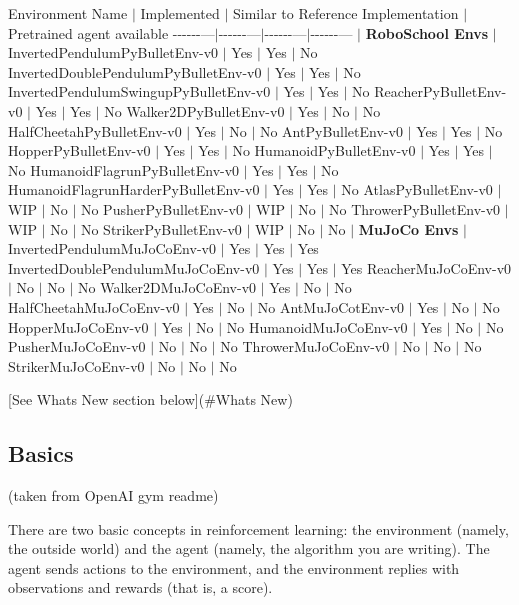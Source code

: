 Environment Name $\vert$ Implemented $\vert$ Similar to Reference Implementation $\vert$ Pretrained agent available -\/-\/-\/-\/-\/-\/---$\vert$-\/-\/-\/-\/-\/-\/---$\vert$-\/-\/-\/-\/-\/-\/---$\vert$-\/-\/-\/-\/-\/-\/--- $\vert$ {\bfseries Robo\+School Envs} $\vert$ Inverted\+Pendulum\+Py\+Bullet\+Env-\/v0 $\vert$ Yes $\vert$ Yes $\vert$ No Inverted\+Double\+Pendulum\+Py\+Bullet\+Env-\/v0 $\vert$ Yes $\vert$ Yes $\vert$ No Inverted\+Pendulum\+Swingup\+Py\+Bullet\+Env-\/v0 $\vert$ Yes $\vert$ Yes $\vert$ No Reacher\+Py\+Bullet\+Env-\/v0 $\vert$ Yes $\vert$ Yes $\vert$ No Walker2\+D\+Py\+Bullet\+Env-\/v0 $\vert$ Yes $\vert$ No $\vert$ No Half\+Cheetah\+Py\+Bullet\+Env-\/v0 $\vert$ Yes $\vert$ No $\vert$ No Ant\+Py\+Bullet\+Env-\/v0 $\vert$ Yes $\vert$ Yes $\vert$ No Hopper\+Py\+Bullet\+Env-\/v0 $\vert$ Yes $\vert$ Yes $\vert$ No Humanoid\+Py\+Bullet\+Env-\/v0 $\vert$ Yes $\vert$ Yes $\vert$ No Humanoid\+Flagrun\+Py\+Bullet\+Env-\/v0 $\vert$ Yes $\vert$ Yes $\vert$ No Humanoid\+Flagrun\+Harder\+Py\+Bullet\+Env-\/v0 $\vert$ Yes $\vert$ Yes $\vert$ No Atlas\+Py\+Bullet\+Env-\/v0 $\vert$ W\+IP $\vert$ No $\vert$ No Pusher\+Py\+Bullet\+Env-\/v0 $\vert$ W\+IP $\vert$ No $\vert$ No Thrower\+Py\+Bullet\+Env-\/v0 $\vert$ W\+IP $\vert$ No $\vert$ No Striker\+Py\+Bullet\+Env-\/v0 $\vert$ W\+IP $\vert$ No $\vert$ No $\vert$ {\bfseries Mu\+Jo\+Co Envs} $\vert$ Inverted\+Pendulum\+Mu\+Jo\+Co\+Env-\/v0 $\vert$ Yes $\vert$ Yes $\vert$ Yes Inverted\+Double\+Pendulum\+Mu\+Jo\+Co\+Env-\/v0 $\vert$ Yes $\vert$ Yes $\vert$ Yes Reacher\+Mu\+Jo\+Co\+Env-\/v0 $\vert$ No $\vert$ No $\vert$ No Walker2\+D\+Mu\+Jo\+Co\+Env-\/v0 $\vert$ Yes $\vert$ No $\vert$ No Half\+Cheetah\+Mu\+Jo\+Co\+Env-\/v0 $\vert$ Yes $\vert$ No $\vert$ No Ant\+Mu\+Jo\+Cot\+Env-\/v0 $\vert$ Yes $\vert$ No $\vert$ No Hopper\+Mu\+Jo\+Co\+Env-\/v0 $\vert$ Yes $\vert$ No $\vert$ No Humanoid\+Mu\+Jo\+Co\+Env-\/v0 $\vert$ Yes $\vert$ No $\vert$ No Pusher\+Mu\+Jo\+Co\+Env-\/v0 $\vert$ No $\vert$ No $\vert$ No Thrower\+Mu\+Jo\+Co\+Env-\/v0 $\vert$ No $\vert$ No $\vert$ No Striker\+Mu\+Jo\+Co\+Env-\/v0 $\vert$ No $\vert$ No $\vert$ No

\mbox{[}See What\textquotesingle{}s New section below\mbox{]}(\#\+What\textquotesingle{}s New)

\subsection*{Basics}

(taken from Open\+AI gym readme)

There are two basic concepts in reinforcement learning\+: the environment (namely, the outside world) and the agent (namely, the algorithm you are writing). The agent sends {\ttfamily actions} to the environment, and the environment replies with {\ttfamily observations} and {\ttfamily rewards} (that is, a score).

